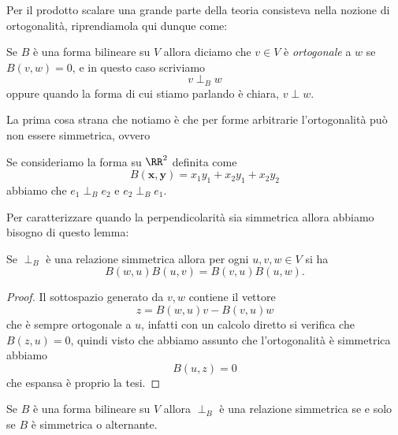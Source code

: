 \documentclass[11pt]{scrartcl}
\begin{document}
	Per il prodotto scalare una grande parte della teoria consisteva nella nozione di ortogonalità, riprendiamola qui dunque come:
	\begin{definition}[Ortogonalità]
		Se $B$ è una forma bilineare su $V$ allora diciamo che $v\in V$ è \textit{ortogonale} a $w$ se $B(v,w)=0$, e in questo caso scriviamo
		$$v\perp_B w$$
		oppure quando la forma di cui stiamo parlando è chiara, $v\perp w$.
	\end{definition}
	La prima cosa strana che notiamo è che per forme arbitrarie l'ortogonalità può non essere simmetrica, ovvero
	\begin{example}
		Se consideriamo la forma su $\RR^2$ definita come
		$$B(\mathbf{x},\mathbf{y})=x_1y_1+x_2y_1+x_2y_2$$
		abbiamo che $e_1\perp_B e_2$ e $e_2\perp_B e_1$.
	\end{example}
	Per caratterizzare quando la perpendicolarità sia simmetrica allora abbiamo bisogno di questo lemma:
	\begin{lemma}\label{Bilin&Quad:Condizione necessaria per la simmetria della perpendicolarità}
		Se $\perp_B$ è una relazione simmetrica allora per ogni $u,v,w\in V$ si ha
		$$B(w,u)B(u,v)=B(v,u)B(u,w).$$
	\end{lemma}
	\begin{proof}
		Il sottospazio generato da $v,w$ contiene il vettore 
		$$z=B(w,u)v-B(v,u)w$$
		che è sempre ortogonale a $u$, infatti con un calcolo diretto si verifica che $B(z,u)=0$, quindi visto che abbiamo assunto che l'ortogonalità è simmetrica abbiamo
		$$B(u,z)=0$$
		che espansa è proprio la tesi.
	\end{proof}
	\begin{theorem}
		Se $B$ è una forma bilineare su $V$ allora $\perp_B$ è una relazione simmetrica se e solo se $B$ è simmetrica o alternante.
	\end{theorem}
\end{document}

